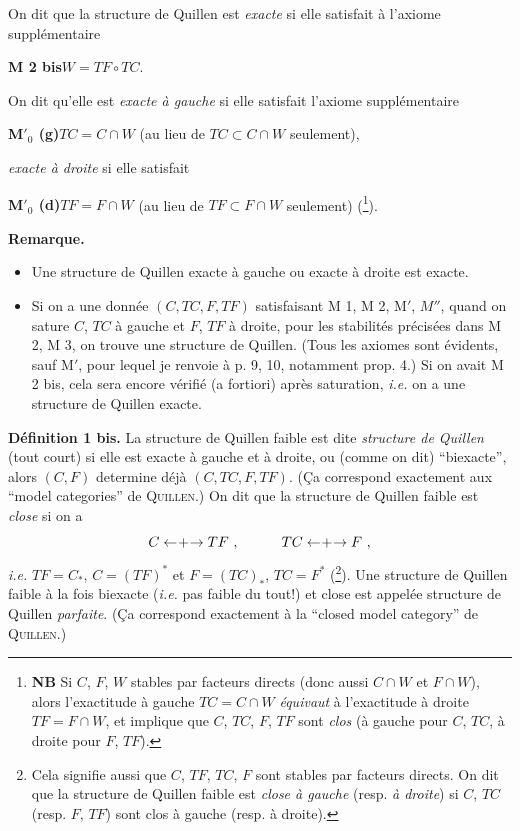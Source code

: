 \documentclass[11pt]{article}
\newcommand{\printedpage}[1]{\marginpar{\footnotesize p.~#1}}
\newcommand{\msp}[1]{\marginpar{\footnotesize [#1]}}
\newcommand{\clarrow}{\mathrel{\leftarrow\mkern-4mu{+}\mkern-4mu\rightarrow}}
\begin{document}
\noindent On dit que la structure de Quillen est \textit{exacte} si elle satisfait à l'axiome supplémentaire

\clearpage
\printedpage{17}

\noindent\textbf{M 2 bis}\qquad $W = TF \circ TC$.

\noindent On dit qu'elle est \textit{exacte à gauche} si elle satisfait l'axiome supplémentaire

\noindent\textbf{M$'_0$ (g)}\qquad $TC = C \cap W$ (au lieu de $TC \subset C \cap W$ seulement),

\noindent\textit{exacte à droite} si elle satisfait

\noindent\textbf{M$'_0$ (d)}\qquad $TF = F \cap W$ (au lieu de $TF \subset F \cap W$ seulement) (\footnote[20]{\textbf{NB} Si $C$, $F$, $W$ stables par facteurs directs (donc aussi $C \cap W$ et $F \cap W$), alors l'exactitude à gauche $TC = C \cap W$ \textit{équivaut} à l'exactitude à droite $TF = F \cap W$, et implique que $C$, $TC$, $F$, $TF$ sont \textit{clos} (à gauche pour $C$, $TC$, à droite pour $F$, $TF$).}).

\msp{page 28}
\noindent\textbf{Remarque.}
\begin{itemize}[leftmargin=3em]
\item[a)] Une structure de Quillen exacte à gauche ou exacte à droite est exacte.
\item[b)] Si on a une donnée $(C, TC, F, TF)$ satisfaisant M 1, M 2, M$'$, $M''$, quand on sature $C$, $TC$ à gauche et $F$, $TF$ à droite, pour les stabilités précisées dans M 2, M 3, on trouve une structure de Quillen. (Tous les axiomes sont évidents, sauf M$'$, pour lequel je renvoie à p. 9, 10, notamment prop. 4.) Si on avait M 2 bis, cela sera encore vérifié (a fortiori) après saturation, \textit{i.e.} on a une structure de Quillen exacte.
\end{itemize}

\noindent\textbf{Définition 1 bis.} La structure de Quillen faible est dite \textit{structure de Quillen} (tout court) si elle est exacte à gauche et à droite, ou (comme on dit) “biexacte”, alors $(C, F)$ determine déjà $(C, TC, F, TF)$. (Ça correspond exactement aux “model categories” de \textsc{Quillen}.) On dit que la structure de Quillen faible est \textit{close} si on a %
\[
C \clarrow TF\ , \qquad\quad TC \clarrow F\ ,
\]
\textit{i.e.} $TF = C_*$, $C = (TF)^*$ et $F = (TC)_*$, $TC = F^*$ (\footnote[21]{Cela signifie aussi que $C$, $TF$, $TC$, $F$ sont stables par facteurs directs. On dit que la structure de Quillen faible est \textit{close à gauche} (resp. \textit{à droite}) si $C$, $TC$ (resp. $F$, $TF$) sont clos à gauche (resp. à droite).}). Une structure de Quillen faible à la fois biexacte (\textit{i.e.} pas faible du tout!) et close est appelée structure de Quillen \textit{parfaite}. (Ça correspond exactement à la “closed model category” de \textsc{Quillen}.)
\end{document}
